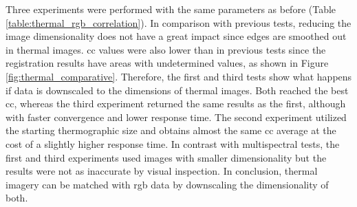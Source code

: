 Three experiments were performed with the same parameters as before (Table \ref{table:thermal_rgb_correlation}). In comparison with previous tests, reducing the image dimensionality does not have a great impact since edges are smoothed out in thermal images. \acrshort{cc} values were also lower than in previous tests since the registration results have areas with undetermined values, as shown in Figure \ref{fig:thermal_comparative}. Therefore, the first and third tests show what happens if data is downscaled to the dimensions of thermal images. Both reached the best \acrshort{cc}, whereas the third experiment returned the same results as the first, although with faster convergence and lower response time. The second experiment utilized the starting thermographic size and obtains almost the same \acrshort{cc} average at the cost of a slightly higher response time. In contrast with multispectral tests, the first and third experiments used images with smaller dimensionality but the results were not as inaccurate by visual inspection. In conclusion, thermal imagery can be matched with \acrshort{rgb} data by downscaling the dimensionality of both. 

